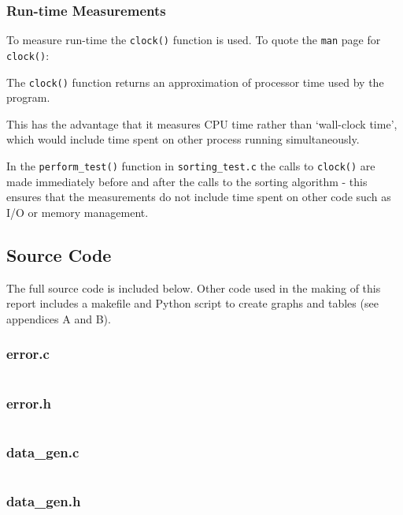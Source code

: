 \documentclass{article}
\begin{document}
\subsubsection{Run-time Measurements}

To measure run-time the \texttt{clock()} function is used. To quote the \texttt{man} page for \texttt{clock()}:

\begin{displayquote}
The \texttt{clock()} function returns an approximation of processor time used by the program.
\end{displayquote}

This has the advantage that it measures CPU time rather than `wall-clock time', which would include time spent on other process running simultaneously.

In the \texttt{perform\_test()} function in \texttt{sorting\_test.c} the calls to \texttt{clock()} are made immediately before and after the calls to the sorting algorithm - this ensures that the measurements do not include time spent on other code such as I/O or memory management.

\subsection{Source Code}

The full source code is included below. Other code used in the making of this report includes a makefile and Python script to create graphs and tables (see appendices A and B).

\subsubsection{error.c}
\inputminted{c}{alg-cw1/src/error.c}

\subsubsection{error.h}
\inputminted{c}{alg-cw1/src/error.h}

\subsubsection{data\_gen.c}
\inputminted{c}{alg-cw1/src/data_gen.c}

\subsubsection{data\_gen.h}
\inputminted{c}{alg-cw1/src/data_gen.h}
\end{document}
